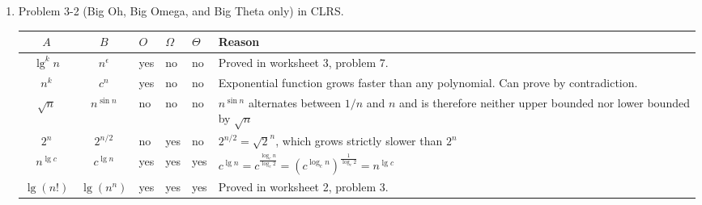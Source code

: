\documentclass[letterpaper,11pt]{article}
\begin{document}
\begin{enumerate}
\textbf{Solution:}

\begin{proof}
Since $f(n)$ is an asymptotically nonnegative function, by definition there exists some $n_1>0$ such that $f(n)\geq 0$ for all $n\geq n_1$. By the same token, for some $n_2>0$, $g(n) \geq 0$ for all $n\geq n_2$.

Note then that
\begin{align*}
0&\leq \frac{1}{2}(f(n) + g(n))& \text{when } n\geq \max\{n_1,n_2\} \text{(since $f(n)\geq 0$, $g(n)\geq 0$)}\\
 &\leq \max\{f(n), g(n)\} & \text{average of two values is at most the maximum value}\\
 &\leq f(n) + g(n).
\end{align*}
Therefore, for $n_0 = \max\{n_1,n_2\}$, $c_1=1/2$ and $c_2=1$, we have that \[0\leq c_1(f(n) + g(n)) \leq \max\{f(n),g(n)\} \leq c_2(f(n) + g(n)),\] and by definition $\max\{f(n),g(n)\} = \Theta(f(n) + g(n))$.
\end{proof}

\item Problem 3-2 (Big Oh, Big Omega, and Big Theta only) in CLRS.

\begin{table}[!h]
\begin{center}
\begin{tabular}{cc|l|l|l|l}
$A$        & $B$           & $O$   & $\Omega$ & $\Theta$ & Reason \\ \hline
$\lg^kn$   & $n^\epsilon$  & yes   &  no      &  no   &   Proved in worksheet 3, problem 7. \\ \hline
$n^k$      & $c^n$         & yes   &  no      &  no &   \begin{minipage}{9cm} Exponential function grows faster than any polynomial. Can prove by contradiction.
\end{minipage}\\ \hline
$\sqrt{n}$ & $n^{\sin{n}}$ & no &  no      &  no   & \begin{minipage}{9cm} $n^{\sin n}$ alternates between $1/n$ and $n$ and is therefore neither upper bounded nor lower bounded by $\sqrt{n}$\end{minipage}   \\ \hline
$2^n$& $2^{n/2}$ & no &  yes &  no  & 
\begin{minipage}{9cm}$2^{n/2} = \sqrt{2}^n$, which grows strictly slower than $2^n$
\end{minipage}\\ \hline
$n^{\lg c}$& $c^{\lg{n}}$ & yes &  yes &  yes & $c^{\lg n} = c^\frac{\log_c{n}}{\log_c 2} = (c^{\log_cn})^{\frac{1}{\log_c2}} = n^{\lg c}$\\ \hline
$\lg (n!)$& $\lg(n^n)$ & yes &  yes &  yes & Proved in worksheet 2, problem 3.\\ \hline
\end{tabular}
\end{center}
\end{table}


\end{enumerate}
\end{document}
